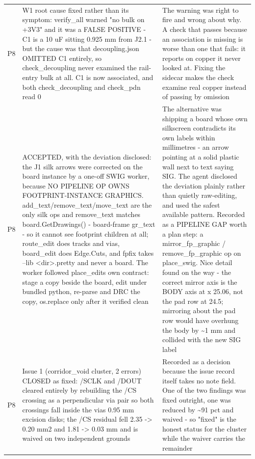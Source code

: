 \documentclass[11pt,a4paper]{article}
\begin{document}
{\begin{longtable}{lp{5.2cm}p{7.2cm}}
P8 & W1 root cause fixed rather than its symptom: verify\_all warned "no bulk on +3V3" and it was a FALSE POSITIVE - C1 is a 10 uF sitting 0.925 mm from J2.1 - but the cause was that decoupling.json OMITTED C1 entirely, so check\_decoupling never examined the rail-entry bulk at all. C1 is now associated, and both check\_decoupling and check\_pdn read 0 & The warning was right to fire and wrong about why. A check that passes because an association is missing is worse than one that fails: it reports on copper it never looked at. Fixing the sidecar makes the check examine real copper instead of passing by omission \\
P8 & ACCEPTED, with the deviation disclosed: the J1 silk arrows were corrected on the board instance by a one-off SWIG worker, because NO PIPELINE OP OWNS FOOTPRINT-INSTANCE GRAPHICS. add\_text/remove\_text/move\_text are the only silk ops and remove\_text matches board.GetDrawings() - board-frame gr\_text - so it cannot see footprint children at all; route\_edit does tracks and vias, board\_edit does Edge.Cuts, and fpfix takes --lib \textless{}dir\textgreater{}.pretty and never a board. The worker followed place\_edits own contract: stage a copy beside the board, edit under bundled python, re-parse and DRC the copy, os.replace only after it verified clean & The alternative was shipping a board whose own silkscreen contradicts its own labels within millimetres - an arrow pointing at a solid plastic wall next to text saying SIG. The agent disclosed the deviation plainly rather than quietly raw-editing, and used the safest available pattern. Recorded as a PIPELINE GAP worth a plan step: a mirror\_fp\_graphic / remove\_fp\_graphic op on place\_swig. Nice detail found on the way - the correct mirror axis is the BODY axis at x 25.06, not the pad row at 24.5; mirroring about the pad row would have overhung the body by \textasciitilde{}1 mm and collided with the new SIG label \\
P8 & Issue 1 (corridor\_void cluster, 2 errors) CLOSED as fixed: /SCLK and /DOUT cleared entirely by rebuilding the /CS crossing as a perpendicular via pair so both crossings fall inside the vias 0.95 mm excision disks; the /CS residual fell 2.35 -\textgreater{} 0.20 mm2 and 1.81 -\textgreater{} 0.03 mm and is waived on two independent grounds & Recorded as a decision because the issue record itself takes no note field. One of the two findings was fixed outright, one was reduced by \textasciitilde{}91 pct and waived - so "fixed" is the honest status for the cluster while the waiver carries the remainder \\
\bottomrule
\end{longtable}
}
\end{document}
